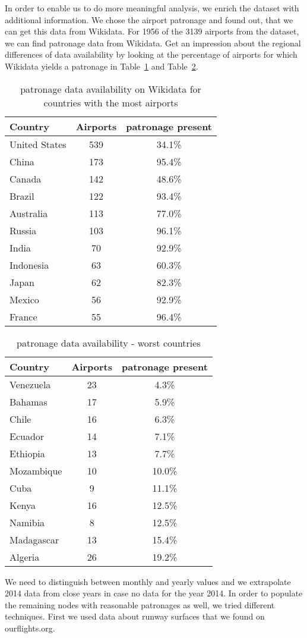 \documentclass[twocolumn]{tum-article}
\begin{document}
In order to enable us to do more meaningful analysis, we enrich the dataset with additional information. We chose the airport patronage and found out, that we can get this data from Wikidata. 
For 1956 of the 3139 airports from the dataset, we can find patronage data from Wikidata. Get an impression about the regional differences of data availability by looking at the percentage of airports for which Wikidata yields a patronage in Table~\ref{tab:patr_av_most_airports} and Table~\ref{tab:patr_av_worst}.
\begin{table}[h]
	\centering
	\caption{patronage data availability on Wikidata for countries with the most airports}
	\label{tab:patr_av_most_airports}
	\begin{tabular}{|l|c|c|}
		\hline
		Country & Airports & patronage present \\ \hline
		United States & 539 & 34.1\%\\
		China & 173 & 95.4\%\\
		Canada & 142 & 48.6\%\\
		Brazil & 122 & 93.4\%\\
		Australia & 113 & 77.0\%\\
		Russia & 103 & 96.1\%\\
		India & 70 & 92.9\%\\
		Indonesia & 63 & 60.3\%\\
		Japan & 62 & 82.3\%\\
		Mexico & 56 & 92.9\%\\
		France & 55 & 96.4\%\\ \hline
	\end{tabular}
\end{table}
\begin{table}[h]
	\centering
	\caption{patronage data availability - worst countries}
	\label{tab:patr_av_worst}
	\begin{tabular}{|l|c|c|}
		\hline
		Country & Airports & patronage present \\ \hline
		Venezuela & 23 & 4.3\%\\
		Bahamas & 17 & 5.9\%\\
		Chile & 16 & 6.3\%\\
		Ecuador & 14 & 7.1\%\\
		Ethiopia & 13 & 7.7\%\\ 
		Mozambique & 10 & 10.0\%\\
		Cuba & 9 & 11.1\%\\
		Kenya & 16 & 12.5\%\\
		Namibia & 8 & 12.5\%\\
		Madagascar & 13 & 15.4\%\\
		Algeria & 26 & 19.2\%\\ \hline
	\end{tabular}
\end{table}
We need to distinguish between monthly and yearly values and we extrapolate 2014 data from close years in case no data for the year 2014. 
In order to populate the remaining nodes with reasonable patronages as well, we tried different techniques. 
First we used data about runway surfaces that we found on ourflights.org. 
\end{document}
